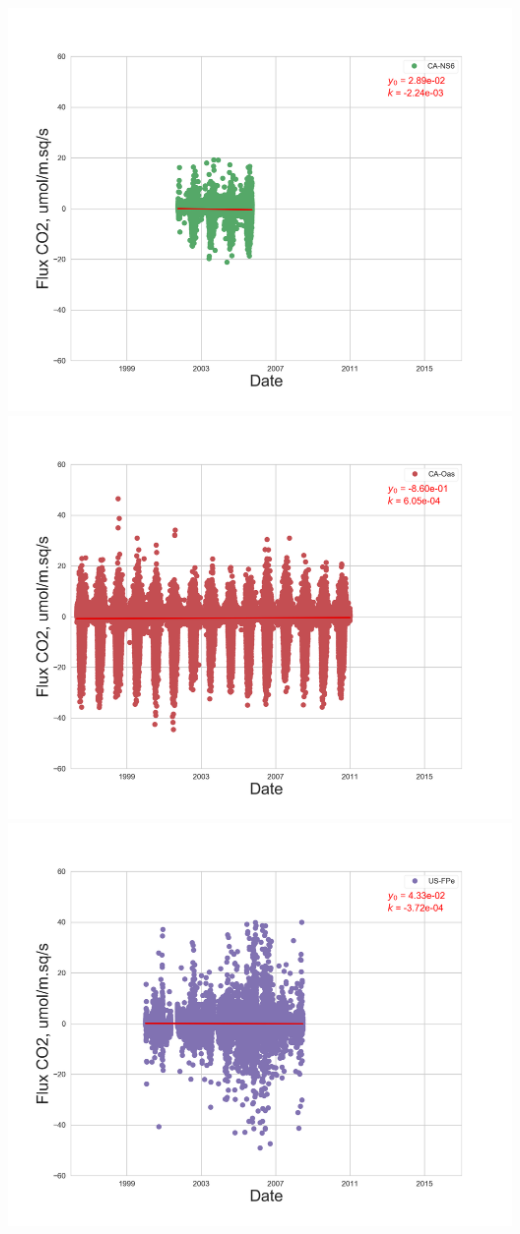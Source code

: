 \documentclass{beamer}
\begin{document}
\begin{frame}
\begin{columns}[t]
\includegraphics[width=\textwidth]{FvsTime/CA-NS6.png}\\
\includegraphics[width=\textwidth]{FvsTime/CA-Oas.png}
\centering
\includegraphics[width=\textwidth]{FvsTime/US-FPe.png}\\

\end{columns}
\end{frame}
\end{document}
